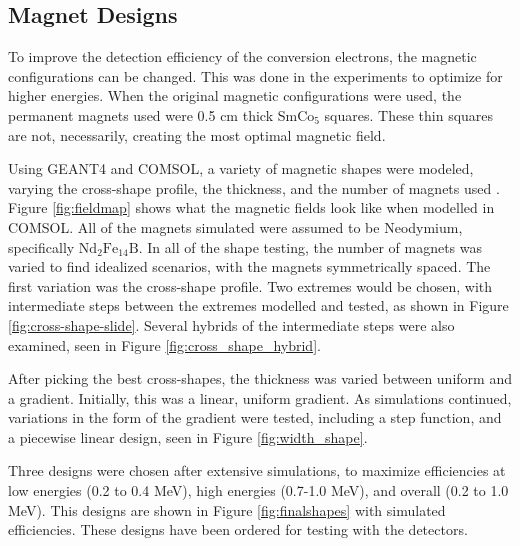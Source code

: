 

\subsection{Magnet Designs}

To improve the detection efficiency of the conversion electrons, the magnetic configurations can be changed. This was done in the experiments to optimize for higher energies. When the original magnetic configurations were used, the permanent magnets used were 0.5 cm thick SmCo$_5$ squares. These thin squares are not, necessarily, creating the most optimal magnetic field.

Using GEANT4 and COMSOL, a variety of magnetic shapes were modeled, varying the cross-shape profile, the thickness, and the number of magnets used \citep{allison16:_geant4,comsol:_comsol}. Figure \ref{fig:fieldmap} shows what the magnetic fields look like when modelled in COMSOL. All of the magnets simulated were assumed to be Neodymium, specifically $\text{Nd}_{2}\text{Fe}_{14}\text{B}$.  In all of the shape testing, the number of magnets was varied to find idealized scenarios, with the magnets symmetrically spaced. The first variation was the cross-shape profile. Two extremes would be chosen, with intermediate steps between the extremes modelled and tested, as shown in Figure \ref{fig:cross-shape-slide}. Several hybrids of the intermediate steps were also examined, seen in Figure \ref{fig:cross_shape_hybrid}.







After picking the best cross-shapes, the thickness was varied between uniform and a gradient. Initially, this was a linear, uniform gradient. As simulations continued, variations in the form of the gradient were tested, including a step function, and a piecewise linear design, seen in Figure \ref{fig:width_shape}.



Three designs were chosen after extensive simulations, to maximize efficiencies at low energies (0.2 to 0.4 MeV), high energies (0.7-1.0 MeV), and overall (0.2 to 1.0 MeV). This designs are shown in Figure \ref{fig:finalshapes} with simulated efficiencies. These designs have been ordered for testing with the detectors.

